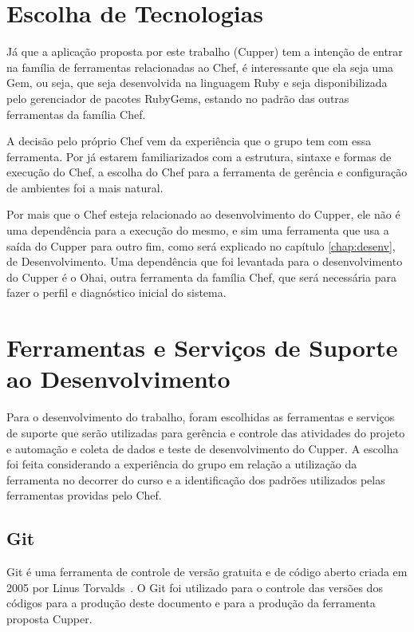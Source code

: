\section{Escolha de Tecnologias}
\label{sec:tec}

Já que a aplicação proposta por este trabalho (Cupper) tem a intenção de entrar
na família de ferramentas relacionadas ao Chef, é interessante que ela seja uma
Gem, ou seja, que seja desenvolvida na linguagem Ruby e seja disponibilizada pelo %
gerenciador de pacotes RubyGems, estando no padrão das outras ferramentas da
família Chef.

A decisão pelo próprio Chef vem da experiência que o grupo tem com essa ferramenta.
Por já estarem familiarizados com a estrutura, sintaxe e formas de execução do Chef,
a escolha do Chef para a ferramenta de gerência e configuração de ambientes foi a
mais natural. %

Por mais que o Chef esteja relacionado ao desenvolvimento do Cupper, ele não é uma
dependência para a execução do mesmo, e sim uma ferramenta que usa a saída do Cupper
para outro fim, como será explicado no capítulo \ref{chap:desenv}, de Desenvolvimento.
Uma dependência que foi levantada para o desenvolvimento do Cupper é o Ohai,
outra ferramenta da família Chef, que será necessária para fazer o perfil e diagnóstico
inicial do sistema. %

\section{Ferramentas e Serviços de Suporte ao Desenvolvimento}
\label{sec:supdev}

Para o desenvolvimento do trabalho, foram escolhidas as ferramentas e serviços de suporte que serão
utilizadas para gerência e controle das atividades do projeto e automação e coleta de dados e teste
de desenvolvimento do Cupper. A escolha foi feita considerando a experiência do
grupo em relação a utilização da ferramenta no decorrer do curso e a identificação dos
padrões utilizados pelas ferramentas providas pelo Chef.

\subsection{Git}
\label{sec:supdev:git}

Git é uma ferramenta de controle de versão gratuita e de código aberto criada
em 2005 por Linus Torvalds~\cite{chacon:2014}. O Git foi utilizado para o controle das versões
dos códigos para a produção deste documento e para a produção da ferramenta proposta Cupper.

